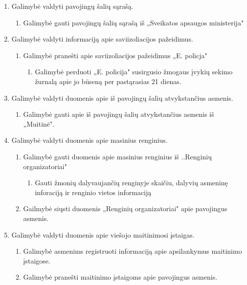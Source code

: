 \documentclass{VUMIFPSkursinis}
\begin{document}
\begin{enumerate}
\begin{enumerate}
	      \end{enumerate}
	\item{Galimybė valdyti pavojingų šalių sąrašą.}
	      \begin{enumerate}
		      \item{Galimybė gauti pavojingų šalių sąrašą iš „Sveikatos apsaugos ministerija"}
	      \end{enumerate}
	\item{Galimybė valdyti informaciją apie saviizoliacijos pažeidimus.}
	      \begin{enumerate}
		      \item{Galimybė pranešti apie saviizoliacijos pažeidimus „E. policja"}
		            \begin{enumerate}
			            \item{Galimybė perduoti „E. policija" susirgusio žmogaus įvykių sekimo žurnalą apie jo būseną per pastąrasias 21 dienas.}
		            \end{enumerate}
	      \end{enumerate}
	\item{Galimybė valdyti duomenis apie iš pavojingų šalių atvykstančius asmenis.}
	      \begin{enumerate}
		      \item{Galimybė gauti apie iš pavojingų šalių atvykstančius asmenis iš „Muitinė".}
	      \end{enumerate}
	\item{Galimybė valdyti duomenis apie masinius renginius.}
	      \begin{enumerate}
		      \item{Galimybė gauti duomenis apie masinius renginius iš ..Renginių organizatoriai"}
		            \begin{enumerate}
			            \item{Gauti žmonių dalyvaujančių renginyje skaičiu, dalyvių asmeninę inforaciją ir renginio vietos informaciją}
		            \end{enumerate}
		      \item{Gailmybė siųsti duomenis „Renginių organizatoriai" apie pavojingus asmenis.}
	      \end{enumerate}
	\item{Galimybė valdyti duomenis apie viešojo maitinimosi įstaigas.}
	      \begin{enumerate}
		      \item{Galimybė asmenims registruoti informaciją apie apsilankymus maitinimo įstaigose.}
		      \item{Galimybė pranešti maitinimo įstaigoms apie pavojingus asmenis.}

\end{enumerate}
\end{enumerate}
\end{document}
